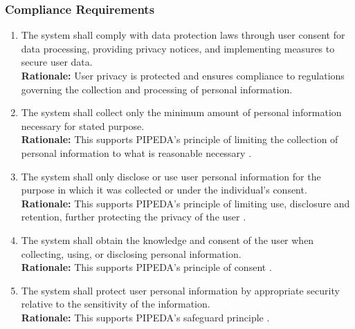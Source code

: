 \documentclass[]{article}
\begin{document}
\subsubsection{Compliance Requirements}
\label{ssub:compliance_requirements}
\begin{enumerate}[{LR-COMP}1. ]
    \item The system shall comply with data protection laws through user consent for data processing, 
    providing privacy notices, and implementing measures to secure user data. \\
    {\bf Rationale:} User privacy is protected and ensures compliance to regulations governing the collection and processing
    of personal information.
    \item The system shall collect only the minimum amount of personal information necessary for stated purpose. \\
    {\bf Rationale:} This supports PIPEDA's principle of limiting the collection of personal information to what is 
    reasonable necessary \cite{10c}.
    \item The system shall only disclose or use user personal information for the purpose in which it was collected or 
    under the individual's consent.\\
    {\bf Rationale:} This supports PIPEDA's principle of limiting use, disclosure and retention, further protecting the 
    privacy of the user \cite{10c}.
    \item The system shall obtain the knowledge and consent of the user when collecting, using, 
    or disclosing personal information. \\
    {\bf Rationale:} This supports PIPEDA's principle of consent \cite{10c}.
    \item The system shall protect user personal information by appropriate security relative to the 
    sensitivity of the information. \\
    {\bf Rationale:} This supports PIPEDA's safeguard principle \cite{10c}.
\end{enumerate}
\end{document}
